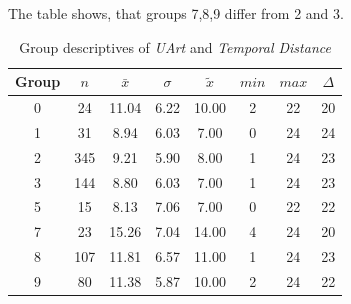 The table shows, that groups 7,8,9 differ from 2 and 3.
\begin{table}[ht]
	\tiny
	\centering
    \begin{tabular}{c|c|c|c|c|c|c|c}
        \toprule
        Group & $n$ & $\bar{x}$ & $\sigma$ & $\tilde{x}$ & $min$ & $max$ & $\Delta$ \\
        \midrule
        0 & 24  & 11.04 & 6.22 & 10.00 & 2  & 22 & 20 \\ 
        1 & 31  & 8.94  & 6.03 & 7.00  & 0  & 24 & 24 \\ 
        2 & 345 & 9.21  & 5.90 & 8.00  & 1  & 24 & 23 \\ 
        3 & 144 & 8.80  & 6.03 & 7.00  & 1  & 24 & 23 \\ 
        5 & 15  & 8.13  & 7.06 & 7.00  & 0  & 22 & 22 \\ 
        7 & 23  & 15.26 & 7.04 & 14.00 & 4  & 24 & 20 \\ 
        8 & 107 & 11.81 & 6.57 & 11.00 & 1  & 24 & 23 \\ 
        9 & 80  & 11.38 & 5.87 & 10.00 & 2  & 24 & 22 \\ 
        \bottomrule
      \end{tabular}
    \caption{Group descriptives of \textit{UArt} and \textit{Temporal Distance}}
    \label{tbl:descriptives_baysis_initiator_UArt_TDist}
\end{table}

